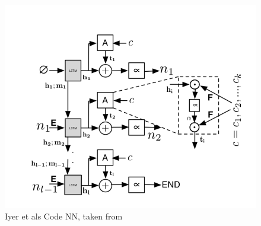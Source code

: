 \begin{figure}[tb]
    \centering
    \includegraphics[width=0.5\linewidth]{ModelPics/Iyer_etal.png}
    \caption{Iyer et als Code NN, taken from \cite{iyer_summarizing_2016}}
    \label{fig:Iyer}
\end{figure}
